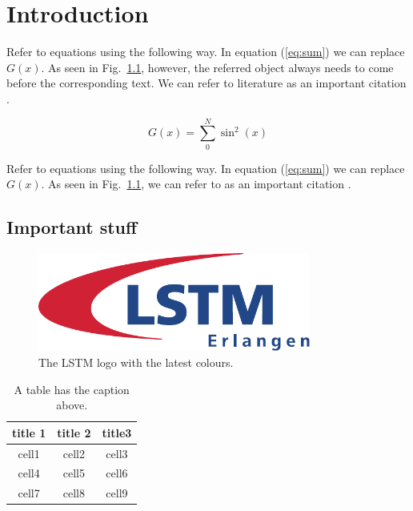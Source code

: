 \chapter{Introduction}
\label{sec:introduction}

Refer to equations using the following way. In equation (\ref{eq:sum}) we can replace $G(x)$. As seen in Fig.\ \ref{fig:logo}, however, the referred object always needs to come before the corresponding text. We can refer to literature \cite{schlatter_orlu_2010} as an important citation \citep[see for instance][and others]{schlatter_orlu_2010}.

\lipsum[2-4]

\begin{equation}\label{eq:sum}
G(x) = \sum_0^N \sin^2(x) 
\end{equation}

Refer to equations using the following way. In equation (\ref{eq:sum}) we can replace $G(x)$. As seen in Fig.\ \ref{fig:logo}, we can refer to \cite{schlatter_orlu_2010} as an important citation \citep[see for instance][and others]{schlatter_orlu_2010}.

\section{Important stuff}

\lipsum[2-4]


\begin{figure}[!ht]
\centering
\includegraphics[width=0.8\textwidth]{bilder/LSTM_Logo.pdf}
\caption{The LSTM logo with the latest colours.}\label{fig:logo}
\end{figure}

\lipsum[2-4]

\begin{table}[!ht]
\centering
\caption{A table has the caption above.}
\begin{tabular}{ c c c  } 
 \hline
  title 1 & title 2 & title3 \\
 \hline
 cell1 & cell2 & cell3 \\ 
 cell4 & cell5 & cell6 \\ 
 cell7 & cell8 & cell9 \\ 
 \hline
\end{tabular}
\end{table}
